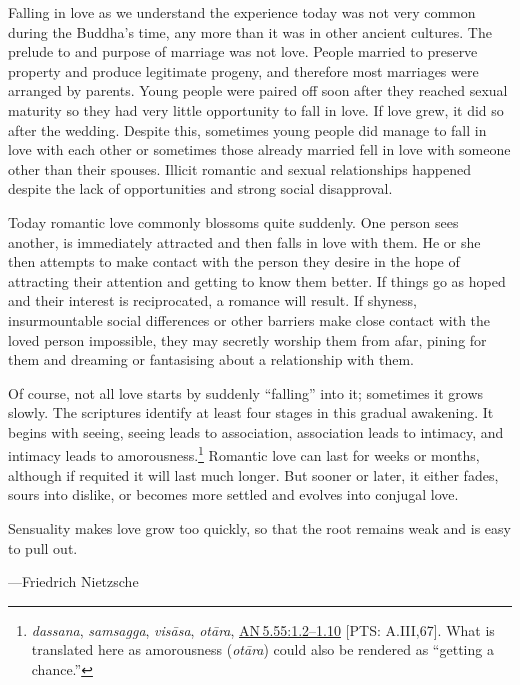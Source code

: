 \documentclass[10pt, openright]{book}
\newenvironment{epigram-2}%
{%
\vspace{1em}
\noindent
\quoting[leftmargin=2.5cm,rightmargin=2.5cm]%
\begin{itshape}
\large
}%
{\end{itshape}\endquoting
}%
\newenvironment{epigram-2-cite}%
{%
\quoting[leftmargin=2.5cm,rightmargin=2.5cm]%
\noindent\normal\hspace*{\fill} 
}%
{\endquoting\vspace{1em}
}%
\begin{document}
Falling in love as we understand the experience today was not very common during the Buddha’s time, any more than it was in other ancient cultures. The prelude to and purpose of marriage was not love. People married to preserve property and produce legitimate progeny, and therefore most marriages were arranged by parents. Young people were paired off soon after they reached sexual maturity so they had very little opportunity to fall in love. If love grew, it did so after the wedding. Despite this, sometimes young people did manage to fall in love with each other or sometimes those already married fell in love with someone other than their spouses. Illicit romantic and sexual relationships happened despite the lack of opportunities and strong social disapproval.


Today romantic love commonly blossoms quite suddenly. One person sees another, is immediately attracted and then falls in love with them. He or she then attempts to make contact with the person they desire in the hope of attracting their attention and getting to know them better. If things go as hoped and their interest is reciprocated, a romance will result. If shyness, insurmountable social differences or other barriers make close contact with the loved person impossible, they may secretly worship them from afar, pining for them and dreaming or fantasising about a relationship with them.


Of course, not all love starts by suddenly “falling” into it; sometimes it grows slowly. The scriptures identify at least four stages in this gradual awakening. It begins with seeing, seeing leads to association, association leads to intimacy, and intimacy leads to amorousness.\footnote {\textit{dassana}, \textit{samsagga}, \textit{visāsa}, \textit{otāra}, \href{https://suttacentral.net/an5.55/en/sujato\#1.2}{AN 5.55:1.2–1.10} [PTS: A.III,67]. What is translated here as amorousness (\textit{otāra}) could also be rendered as “getting a chance.”} Romantic love can last for weeks or months, although if requited it will last much longer. But sooner or later, it either fades, sours into dislike, or becomes more settled and evolves into conjugal love.


\begin{epigram-2}
Sensuality makes love grow too quickly, so that the root remains weak and is easy to pull out.
\end{epigram-2}

\begin{epigram-2-cite}
—Friedrich Nietzsche
\end{epigram-2-cite}
\end{document}
